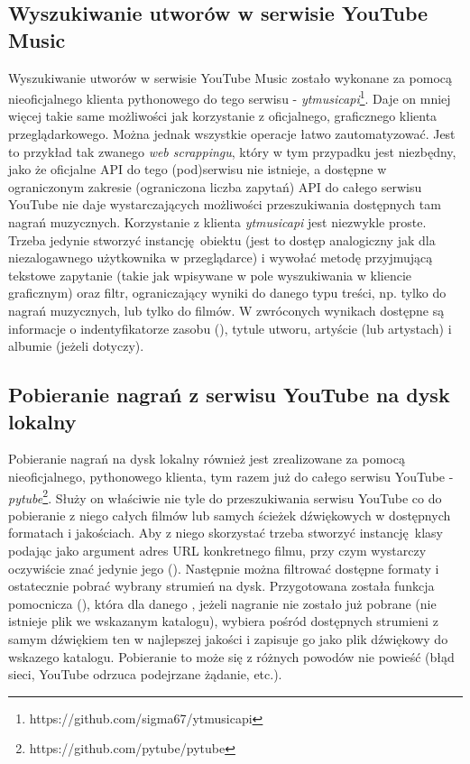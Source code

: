 \subsection{Wyszukiwanie utworów w serwisie YouTube Music}
Wyszukiwanie utworów w serwisie YouTube Music zostało wykonane za pomocą nieoficjalnego klienta
pythonowego do tego serwisu - \emph{ytmusicapi}\footnote{https://github.com/sigma67/ytmusicapi}.
Daje on mniej więcej takie same możliwości jak korzystanie z oficjalnego, graficznego klienta
przeglądarkowego. Można jednak wszystkie operacje łatwo zautomatyzować. Jest to przykład tak zwanego
\emph{web scrappingu}, który w tym przypadku jest niezbędny, jako że oficjalne API do tego (pod)serwisu
nie istnieje, a dostępne w ograniczonym zakresie (ograniczona liczba zapytań) API do całego serwisu
YouTube nie daje wystarczających możliwości przeszukiwania dostępnych tam nagrań muzycznych.
Korzystanie z klienta \emph{ytmusicapi} jest niezwykle proste. Trzeba jedynie stworzyć
instancję obiektu  (jest to dostęp analogiczny jak dla niezalogawnego użytkownika w
przeglądarce) i wywołać metodę  przyjmującą tekstowe zapytanie (takie jak wpisywane w
pole wyszukiwania w kliencie graficznym) oraz filtr, ograniczający wyniki do danego typu treści, np.
tylko do nagrań muzycznych, lub tylko do filmów. W zwróconych wynikach dostępne są informacje o
indentyfikatorze zasobu (), tytule utworu, artyście (lub artystach) i albumie
(jeżeli dotyczy).

\subsection{Pobieranie nagrań z serwisu YouTube na dysk lokalny}
Pobieranie nagrań na dysk lokalny również jest zrealizowane za pomocą nieoficjalnego, pythonowego
klienta, tym razem już do całego serwisu YouTube -
\emph{pytube}\footnote{https://github.com/pytube/pytube}. Służy on właściwie nie tyle do
przeszukiwania serwisu YouTube co do pobieranie z niego całych filmów lub samych ścieżek dźwiękowych
w dostępnych formatach i jakościach. Aby z niego skorzystać trzeba stworzyć instancję klasy
 podając jako argument adres URL konkretnego filmu, przy czym wystarczy oczywiście
znać jedynie jego  (). Następnie
można filtrować dostępne formaty i ostatecznie pobrać wybrany strumień na dysk. Przygotowana została
funkcja pomocnicza (), która dla danego ,
jeżeli nagranie nie zostało już pobrane (nie istnieje plik we wskazanym katalogu), wybiera pośród
dostępnych strumieni z samym dźwiękiem ten w najlepszej jakości i zapisuje go jako plik dźwiękowy do
wskazego katalogu. Pobieranie to może się z różnych powodów nie powieść (błąd sieci, YouTube odrzuca
podejrzane żądanie, etc.).

